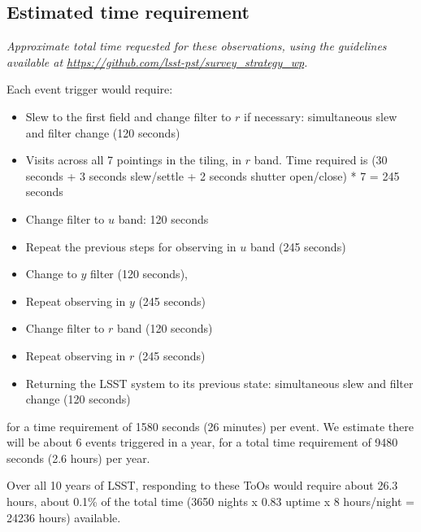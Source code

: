 \documentclass[11pt]{article}
\begin{document}
\subsection{Estimated time requirement}
\begin{footnotesize}
{\it Approximate total time requested for these observations, using the guidelines available at \url{https://github.com/lsst-pst/survey_strategy_wp}.}
\end{footnotesize}

Each event trigger would require:
\begin{itemize}
\item Slew to the first field and change filter to $r$ if necessary: simultaneous slew and filter change (120 seconds) 
\item Visits across all 7 pointings in the tiling, in $r$ band. Time required is (30 seconds + 3 seconds slew/settle + 2 seconds shutter open/close) * 7 =  245 seconds
\item Change filter to $u$ band: 120 seconds 
\item Repeat the previous steps for observing in $u$ band (245 seconds)
\item Change to $y$ filter (120 seconds), 
\item Repeat observing in $y$ (245 seconds)
\item Change filter to $r$ band (120 seconds)
\item Repeat observing in $r$ (245 seconds)
\item Returning the LSST system to its previous state: simultaneous slew and filter change (120 seconds)
\end{itemize}
for a time requirement of 1580 seconds (26 minutes) per event. We estimate there will be about 6 events triggered in a year, for a total time requirement of 9480 seconds (2.6 hours) per year.

Over all 10 years of LSST, responding to these ToOs would require about 26.3 hours, about 0.1\% of the total time (3650 nights x 0.83 uptime x 8 hours/night = 24236 hours) available. 
\end{document}
